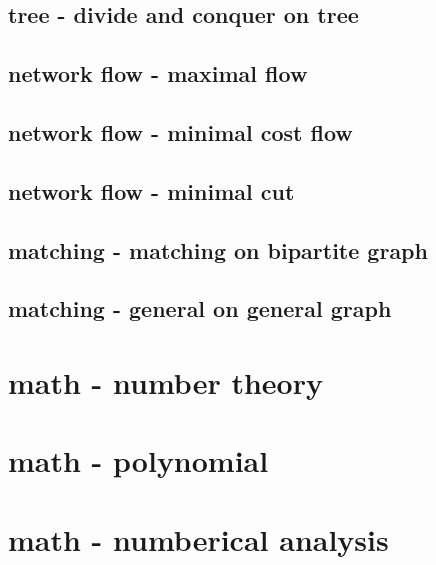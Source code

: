 \documentclass[UTF8, a4paper, titlepage, twoside]{ctexart}
\begin{document}
  \subsection{tree - divide and conquer on tree}

  \subsection{network flow - maximal flow}
    
    

  \subsection{network flow - minimal cost flow}
    
    

  \subsection{network flow - minimal cut}

  \subsection{matching - matching on bipartite graph}
    
    
    

  \subsection{matching - general on general graph}


\section{math - number theory}
  

\section{math - polynomial}

\section{math - numberical analysis}
\end{document}
